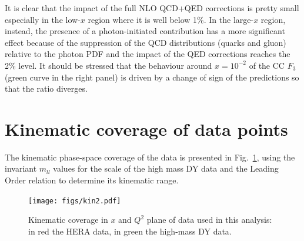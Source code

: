 It is clear that the impact of the full NLO QCD+QED corrections is
pretty small especially in the low-$x$ region where it is well below
1\%. In the large-$x$ region, instead, the presence of a
photon-initiated contribution has a more significant effect because of
the suppression of the QCD distributions (quarks and gluon) relative
to the photon PDF and the impact of the QED corrections reaches the
2\% level.  It should be stressed that the behaviour around
$x=10^{-2}$ of the CC $F_3$ (green curve in the right panel) is driven
by a change of sign of the predictions so that the ratio diverges.


\section{Kinematic coverage of data points}

The kinematic phase-space coverage of the data is presented in Fig.~\ref{fig:data}, using the invariant $m_{ll}$ values                            
for the scale of the high mass DY data and the Leading Order relation to determine its kinematic range.                                              
\begin{figure}[t]                                                                                                                                   
  \begin{center}                                                                                                                                     
    \texttt{[image: figs/kin2.pdf]}                                                                                                      
    \end{center}                                                                                                                                     
    \caption{Kinematic coverage in $x$ and $Q^2$ plane of data used in this analysis: in red the HERA data, in green the high-mass DY data.}         
\label{fig:data}                                                                                                                                     
\end{figure}                                                                                                                                         
